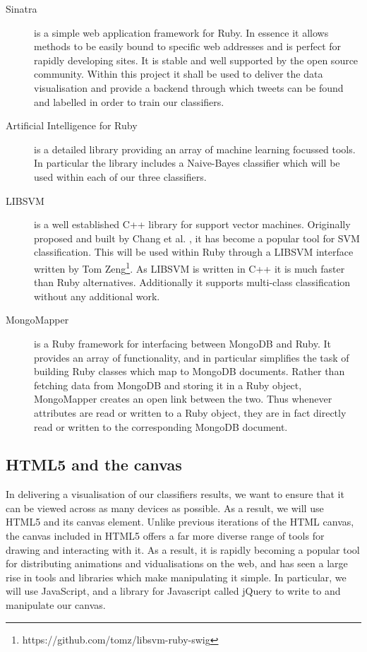 \begin{description}
	\item [Sinatra] is a simple web application framework for Ruby. In essence it allows methods to be easily bound to specific web addresses and is perfect for rapidly developing sites. It is stable and well supported by the open source community. Within this project it shall be used to deliver the data visualisation and provide a backend through which tweets can be found and labelled in order to train our classifiers.
	\item [Artificial Intelligence for Ruby] is a detailed library providing an array of machine learning focussed tools. In particular the library includes a Naive-Bayes classifier which will be used within each of our three classifiers.
	\item [LIBSVM] is a well established C++ library for support vector machines. Originally proposed and built by Chang et al. \cite{Chang:2001ta}, it has become a popular tool for SVM classification. This will be used within Ruby through a LIBSVM interface written by Tom Zeng\footnote{https://github.com/tomz/libsvm-ruby-swig}. As LIBSVM is written in C++ it is much faster than Ruby alternatives. Additionally it supports multi-class classification without any additional work.
	\item [MongoMapper] is a Ruby framework for interfacing between MongoDB and Ruby. It provides an array of functionality, and in particular simplifies the task of building Ruby classes which map to MongoDB documents. Rather than fetching data from MongoDB and storing it in a Ruby object, MongoMapper creates an open link between the two. Thus whenever attributes are read or written to a Ruby object, they are in fact directly read or written to the corresponding MongoDB document.
\end{description}

\subsection{HTML5 and the canvas}

In delivering a visualisation of our classifiers results, we want to ensure that it can be viewed across as many devices as possible. As a result, we will use HTML5 and its canvas element. Unlike previous iterations of the HTML canvas, the canvas included in HTML5 offers a far more diverse range of tools for drawing and interacting with it. As a result, it is rapidly becoming a popular tool for distributing animations and vidualisations on the web, and has seen a large rise in tools and libraries which make manipulating it simple. In particular, we will use JavaScript, and a library for Javascript called jQuery to write to and manipulate our canvas. 
